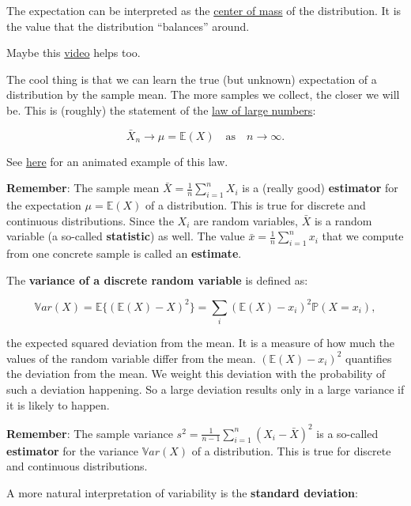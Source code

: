 \documentclass[
]{book}
\begin{document}
The expectation can be interpreted as the \href{https://web.archive.org/web/2025/https://mathcenter.oxford.emory.edu/site/math117/expectedValueAndCenterOfMass/}{center of mass}
of the distribution. It is the value that the distribution ``balances'' around.

Maybe this \href{https://www.youtube.com/watch?v=KLs_7b7SKi4}{video} helps too.

The cool thing is that we can learn the true (but unknown) expectation of a distribution by the sample mean. The more samples we collect, the closer we will be.
This is (roughly) the statement of the \href{https://en.wikipedia.org/wiki/Law_of_large_numbers}{law of large numbers}:

\[\bar{X}_n \rightarrow \mu = \mathbb{E}(X) \quad \text{as} \quad n \rightarrow \infty.\]

See \href{https://github.com/jdegenfellner/ZHAW_Teaching/blob/main/Law_of_Large_Numbers_Dice_animation.R}{here} for an animated example of this law.

\textbf{Remember}: The sample mean \(\bar{X} = \frac{1}{n} \sum_{i=1}^n X_i\) is a (really good) \textbf{estimator} for the expectation \(\mu = \mathbb{E}(X)\) of a distribution.
This is true for discrete and continuous distributions.
Since the \(X_i\) are random variables, \(\bar{X}\) is a random variable (a so-called \textbf{statistic}) as well.
The value \(\bar{x} = \frac{1}{n} \sum_{i=1}^n x_i\) that we compute from one concrete sample is called an \textbf{estimate}.

The \textbf{variance of a discrete random variable} is defined as:

\[\mathbb{V}ar(X) = \mathbb{E} \{ (\mathbb{E}(X) - X)^2 \} = \sum_i (\mathbb{E}(X) - x_i)^2 \mathbb{P}(X = x_i),\]

the expected squared deviation from the mean. It is a measure of how much the values of the random variable differ from the mean.
\((\mathbb{E}(X) - x_i)^2\) quantifies the deviation from the mean. We weight this deviation with the probability of such
a deviation happening. So a large deviation results only in a large variance if it is likely to happen.

\textbf{Remember}: The sample variance \(s^2 = \frac{1}{n-1} \sum_{i=1}^n (X_i - \bar{X})^2\) is a so-called \textbf{estimator}
for the variance \(\mathbb{V}ar(X)\) of a distribution.
This is true for discrete and continuous distributions.

A more natural interpretation of variability is the \textbf{standard deviation}:
\end{document}
